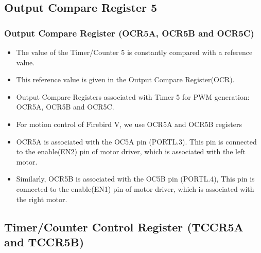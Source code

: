 \documentclass[table,10pt,red]{beamer}	%
\begin{document}
\subsection{Output Compare Register 5} 
\begin{frame}
	\frametitle{Output Compare Register (OCR5A, OCR5B and OCR5C)}
	\begin{itemize}
	  \item <+-|alert@+> The value of the Timer/Counter 5 is constantly compared with a reference value.
	  \item <+-|alert@+> This reference value is given in the Output Compare Register(OCR).
	  \item <+-|alert@+>Output Compare Registers associated with Timer 5 for PWM generation:
	  \pause
	  OCR5A, OCR5B and OCR5C.
	  \pause
	  \item <+-|alert@+> For motion control of Firebird V, we use OCR5A and OCR5B registers
	  \item <+-|alert@+> OCR5A is associated with the OC5A pin (PORTL.3). This pin is connected to the enable(EN2) pin of motor driver, which is associated with the left motor.
	  \item <+-|alert@+> Similarly, OCR5B is associated with the OC5B pin (PORTL.4), This pin is connected to the enable(EN1) pin of motor driver, which is associated with the right motor.
	 	  
	\end{itemize}
\end{frame}

\subsection{Timer/Counter Control Register (TCCR5A and TCCR5B)} %
\end{document}
